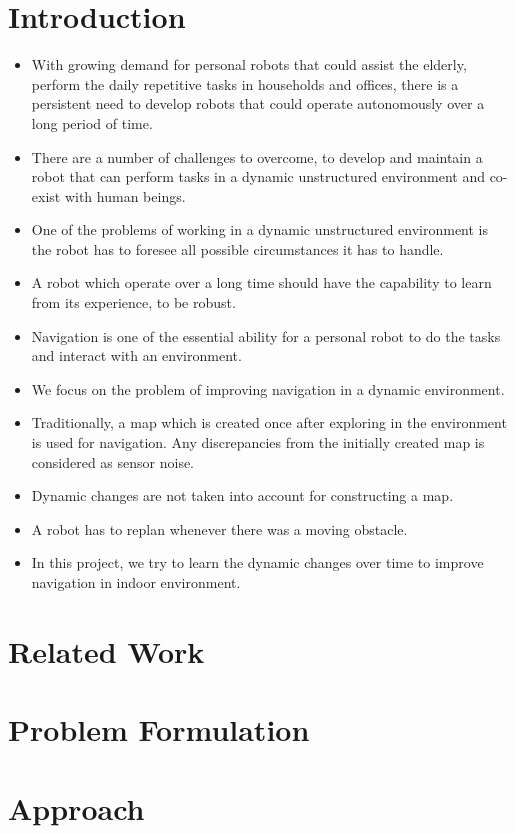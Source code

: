 \documentclass[12pt]{article}
\begin{document}
\section{Introduction}
\begin{itemize}
\item With growing demand for personal robots that could assist the elderly, perform the daily repetitive tasks in households and offices, there is a persistent need to develop robots that could operate autonomously over a long period of time.
\item There are a number of challenges to overcome, to develop and maintain a robot that can perform tasks in a dynamic unstructured environment and co-exist with human beings.
\item One of the problems of working in a dynamic unstructured environment is the robot has to foresee all possible circumstances it has to handle.  
\item A robot which operate over a long time should have the capability to learn from its experience, to be robust.
\\
\item Navigation is one of the essential ability for a personal robot to do the tasks and interact with an environment. 
\item We focus on the problem of improving navigation in a dynamic environment. 
\item Traditionally, a map which is created once after exploring in the environment is used for navigation. Any discrepancies from the initially created map is considered as sensor noise.
\item Dynamic changes are not taken into account for constructing a map. 
\item A robot has to replan whenever there was a moving obstacle.
\item In this project, we try to learn the dynamic changes over time to improve navigation in indoor environment.
\end{itemize}
\section{Related Work}

\section{Problem Formulation}

\section{Approach}\label{sec:approach}
\end{document}
